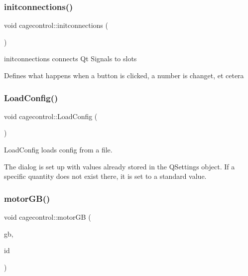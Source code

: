 \subsubsection{\texorpdfstring{initconnections()}{initconnections()}}
{\footnotesize\ttfamily void cagecontrol\+::initconnections (\begin{DoxyParamCaption}{ }\end{DoxyParamCaption})\hspace{0.3cm}{\ttfamily [private]}}



initconnections connects Qt Signals to slots 

Defines what happens when a button is clicked, a number is changet, et cetera \mbox{\label{classcagecontrol_a0e6648cef5e6d08d638aa2472824cb6b}} 
\subsubsection{\texorpdfstring{Load\+Config()}{LoadConfig()}}
{\footnotesize\ttfamily void cagecontrol\+::\+Load\+Config (\begin{DoxyParamCaption}{ }\end{DoxyParamCaption})\hspace{0.3cm}{\ttfamily [private]}}



Load\+Config loads config from a file. 

The dialog is set up with values already stored in the Q\+Settings object. If a specific quantity does not exist there, it is set to a standard value. \mbox{\label{classcagecontrol_a2fd60ea2aa138472e3714dbd25cadc55}} 
\subsubsection{\texorpdfstring{motor\+G\+B()}{motorGB()}}
{\footnotesize\ttfamily void cagecontrol\+::motor\+GB (\begin{DoxyParamCaption}\item[{Q\+Group\+Box $\ast$}]{gb,  }\item[{Q\+String}]{id }\end{DoxyParamCaption})\hspace{0.3cm}{\ttfamily [private]}}



